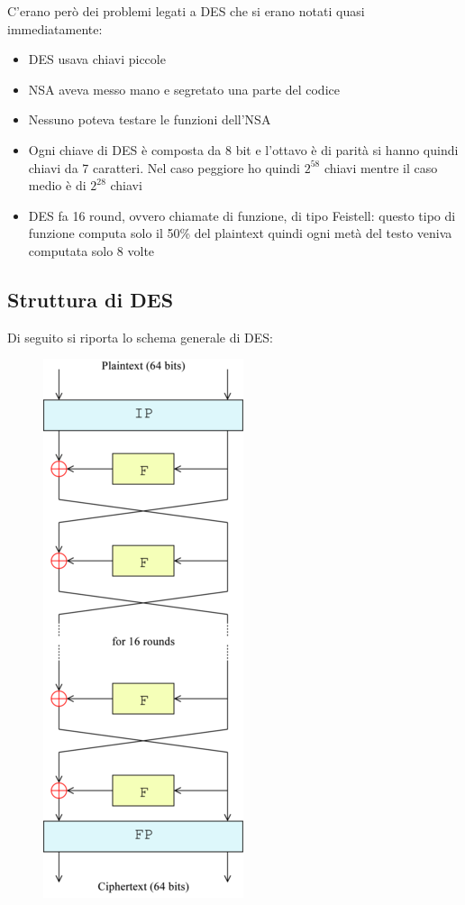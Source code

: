 \documentclass[10pt,a4paper]{article}
\begin{document}
C'erano però dei problemi legati a DES che si erano notati quasi immediatamente:
\begin{itemize}
\item DES usava chiavi piccole
\item NSA aveva messo mano e segretato una parte del codice
\item Nessuno poteva testare le funzioni dell'NSA
\item Ogni chiave di DES è composta da 8 bit e l'ottavo è di parità si hanno quindi chiavi da 7 caratteri. Nel caso peggiore ho quindi $2^{58}$ chiavi mentre il caso medio è di $2^{28}$ chiavi
\item DES fa 16 round, ovvero chiamate di funzione, di tipo Feistell: questo tipo di funzione computa solo il 50\% del plaintext quindi ogni metà del testo veniva computata solo 8 volte
\end{itemize}
\subsection{Struttura di DES}
Di seguito si riporta lo schema generale di DES:

\begin{figure}[htbp]
\includegraphics[scale=0.6]{immagini/DES_fastell.png}
\end{figure}
\end{document}
